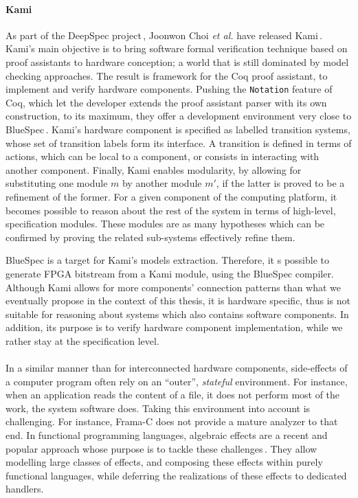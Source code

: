 \paragraph{Kami}
%
As part of the DeepSpec project\,\cite{appel2017deepspec}, Joonwon Choi \emph{et
  al.} have released Kami\,\cite{choi2017kami}.
%
Kami's main objective is to bring software formal verification technique based
on proof assistants to hardware conception; a world that is still dominated by
model checking approaches.
%
The result is framework for the Coq proof assistant, to implement and verify
hardware components.
%
Pushing the \texttt{Notation} feature of Coq, which let the developer extends
the proof assistant parser with its own construction, to its maximum, they offer
a development environment very close to BlueSpec\,\cite{nikhil2004bluespec}.
%
Kami's hardware component is specified as labelled transition systems, whose set
of transition labels form its interface.
%
A transition is defined in terms of actions, which can be local to a component,
or consists in interacting with another component.
%
Finally, Kami enables modularity, by allowing for substituting one module $m$ by
another module $m'$, if the latter is proved to be a refinement of the former.
%
For a given component of the computing platform, it becomes possible to reason
about the rest of the system in terms of high-level, specification modules.
%
These modules are as many hypotheses which can be confirmed by proving the
related sub-systems effectively refine them.

BlueSpec is a target for Kami's models extraction.
%
Therefore, it s possible to generate FPGA bitstream from a Kami module, using
the BlueSpec compiler.
%
Although Kami allows for more components’ connection patterns than what we
eventually propose in the context of this thesis, it is hardware specific, thus
is not suitable for reasoning about systems which also contains software
components.
%
In addition, its purpose is to verify hardware component implementation, while
we rather stay at the specification level.

\paragraph{}
%
In a similar manner than for interconnected hardware components, side-effects of
a computer program often rely on an ``outer'', \emph{stateful} environment.
%
For instance, when an application reads the content of a file, it does not
perform most of the work, the system software does.
%
Taking this environment into account is challenging.
%
For instance, Frama-C does not provide a mature analyzer to that end.
%
In functional programming languages, algebraic effects are a recent and popular
approach whose purpose is to tackle these
challenges\,\cite{brady2014effects,bauer2015effects}.
%
They allow modelling large classes of effects, and composing these effects
within purely functional languages, while deferring the realizations of these
effects to dedicated handlers.

